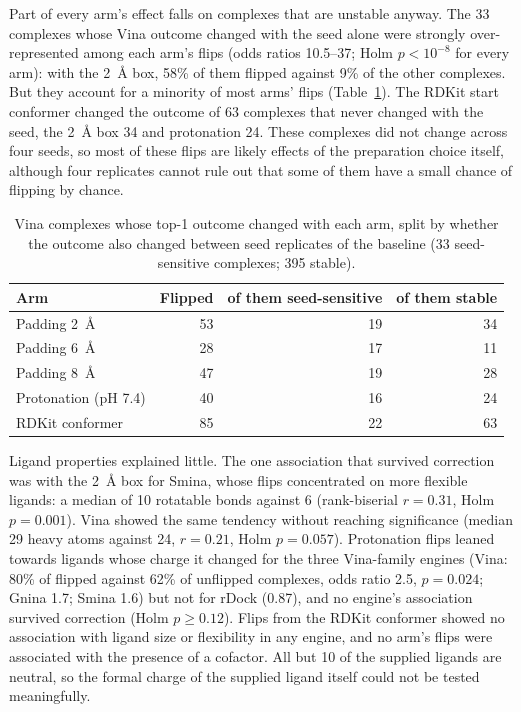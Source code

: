 Part of every arm's effect falls on complexes that are unstable anyway. The 33 complexes
whose Vina outcome changed with the seed alone were strongly over-represented among each
arm's flips (odds ratios 10.5--37; Holm $p < 10^{-8}$ for every arm): with the
\SI{2}{\angstrom} box, 58\% of them flipped against 9\% of the other complexes. But they
account for a minority of most arms' flips (Table~\ref{tab:stable-flips}). The RDKit start
conformer changed the outcome of 63 complexes that never changed with the seed, the
\SI{2}{\angstrom} box 34 and protonation 24. These complexes did not change across four
seeds, so most of these flips are likely effects of the preparation choice itself, although
four replicates cannot rule out that some of them have a small chance of flipping by
chance.

\begin{table}[h]
  \centering
  \caption{Vina complexes whose top-1 outcome changed with each arm, split by whether
    the outcome also changed between seed replicates of the baseline (33 seed-sensitive
    complexes; 395 stable).}
  \label{tab:stable-flips}
  \begin{tabular}{lrrr}
    \toprule
    Arm & Flipped & of them seed-sensitive & of them stable \\
    \midrule
    Padding \SI{2}{\angstrom} & 53 & 19 & 34 \\
    Padding \SI{6}{\angstrom} & 28 & 17 & 11 \\
    Padding \SI{8}{\angstrom} & 47 & 19 & 28 \\
    Protonation (pH 7.4) & 40 & 16 & 24 \\
    RDKit conformer & 85 & 22 & 63 \\
    \bottomrule
  \end{tabular}
\end{table}

Ligand properties explained little. The one association that survived correction was with
the \SI{2}{\angstrom} box for Smina, whose flips concentrated on more flexible ligands: a
median of 10 rotatable bonds against 6 (rank-biserial $r = 0.31$, Holm $p = 0.001$). Vina
showed the same tendency without reaching significance (median 29 heavy atoms against 24,
$r = 0.21$, Holm $p = 0.057$). Protonation flips leaned towards ligands whose charge it
changed for the three Vina-family engines (Vina: 80\% of flipped against 62\% of unflipped
complexes, odds ratio 2.5, $p = 0.024$; Gnina 1.7; Smina 1.6) but not for rDock (0.87),
and no engine's association survived correction (Holm $p \ge 0.12$). Flips from the RDKit conformer showed no association with ligand size
or flexibility in any engine, and no arm's flips were associated with the presence of a
cofactor. All but 10 of the supplied ligands are neutral, so the formal charge of the
supplied ligand itself could not be tested meaningfully.

